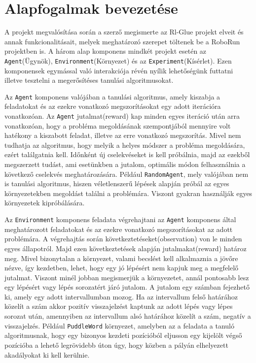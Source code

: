 \section{Alapfogalmak bevezetése}\label{sec:AlapfogalmakBevezetese}

A projekt megvalósítása során a szerző megismerte az  Rl-Glue projekt elveit és annak funkcionalitásait, melyek meghatározó szerepet töltenek be a RoboRun projektben is. A három alap komponens mindkét projekt esetén  az \texttt{Agent}(Ügynök), \texttt{Environment}(Környezet) és az \texttt{Experiment}(Kísérlet). Ezen komponensek egymással való interakciója révén nyílik lehetőségünk futtatni illetve tesztelni a megerősítéses tanulási algoritmusokat. 

	Az \texttt{Agent} komponens valójában a tanulási algoritmus, amely kiszabja a feladatokat és az ezekre vonatkozó megszorításokat egy adott iterációra vonatkozóan. Az \texttt{Agent} jutalmat(reward) kap minden egyes iteráció után arra vonatkozóan, hogy a probléma megoldásának szempontjából mennyire volt hatékony a kiszabott feladat, illetve az erre vonatkozó megszorítás. Mivel nem tudhatja az algoritmus, hogy melyik a helyes módszer a probléma megoldására, ezért találgatnia kell. Időnként új cselekvéseket is kell próbálnia, majd az ezekből megszerzett tudást, ami esetünkben a jutalom, optimális módon felhasználnia a következő cselekvés meghatározására. Például \texttt{RandomAgent}, mely valójában nem is tanulási algoritmus, hiszen véletlenszerű lépések alapján próbál az egyes környezetekben megoldást találni a problémára. Viszont gyakran használják egyes környezetek kipróbálására.
	
	Az \texttt{Environment} komponens feladata végrehajtani az \texttt{Agent} komponens által meghatározott feladatokat és az ezekre vonatkozó megszorításokat az adott problémára. A végrehajtás során következtetéseket(observation) von le minden egyes állapotról. Majd ezen következtetések alapján jutalmakat(reward) határoz meg. Mivel bizonytalan a környezet,    valami becslést kell alkalmaznia a jövőre nézve, így kezdetben, lehet, hogy egy jó lépésért nem kapjuk meg a megfelelő jutalmat. Viszont minél jobban megismerjük a környezetet, annál pontosabb lesz egy lépésért vagy lépés sorozatért járó jutalom. A jutalom egy számban fejezhető ki, amely egy adott intervallumban mozog. Ha az intervallum felső határához közelít a szám akkor pozitív visszajelzést kaptunk az adott lépés vagy lépes sorozat után, amennyiben az intervallum alsó határához közelít a szám, negatív a visszajelzés. Például \texttt{PuddleWord} környezet, amelyben az a feladata a tanuló algoritmusnak, hogy egy bizonyos kezdeti pozícióból eljusson egy kijelölt végső pozícióba a lehető legrövidebb úton úgy, hogy közben a pályán elhelyezett akadályokat ki kell kerülnie.
	
